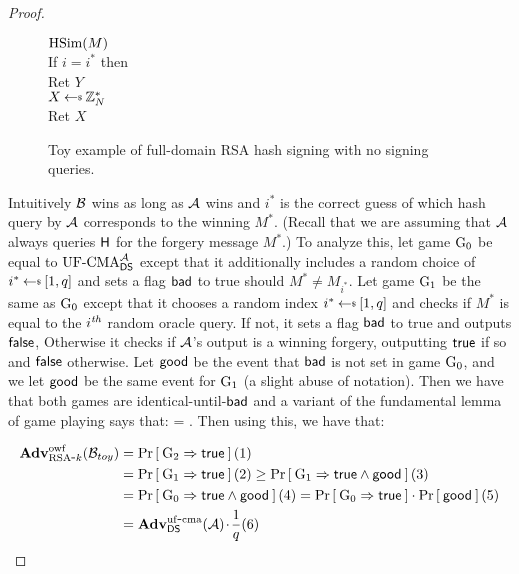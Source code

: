 \begin{proof}
\begin{figure}
{\underline{$\textnormal{HSim}(M)$}\\
If $i = i^*$ then\\
\myInd Ret $Y$\\
$X \getsr \Z_N^*$\\
Ret $X$
}
  \caption{Toy example of full-domain RSA hash signing with no signing queries.}
\label{fig:fulldomaintoy}
\end{figure}


Intuitively ${\mathcal B}$ wins as long as ${\mathcal A}$ wins and $i^*$ is the correct guess
of which hash query by ${\mathcal A}$ corresponds to the winning $M^*$. (Recall that we
are assuming that ${\mathcal A}$ always queries $\mathsf{H}$ for the forgery message
$M^*$.) To analyze this, let game ${{\textnormal G}}_0$ be equal to $\textnormal{UF-CMA}_{{\mathsf{DS}}}^{\mathcal A}$ except
that it additionally includes a random choice of $i^* \getsr [1,q]$ and sets a
flag $\mathsf{bad}$ to true should $M^* \ne M_{i^*}$. Let
game ${{\textnormal G}}_1$ be the same as ${{\textnormal G}}_0$ except that  it chooses a random index $i^*
\getsr [1,q]$ and checks if $M^*$ is equal to the $i^{\textit{th}}$ random oracle
query. If not, it sets a flag $\mathsf{bad}$ to true and outputs $\mathsf{false}$, 
Otherwise it checks if ${\mathcal A}$'s output is a winning forgery, outputting
$\mathsf{true}$ if so and $\mathsf{false}$ otherwise. Let $\mathsf{good}$ be the event that $\mathsf{bad}$ is
not set in game ${{\textnormal G}}_0$, and we let $\mathsf{good}$ be the same event for ${{\textnormal G}}_1$ (a
slight abuse of notation). Then we have that both games are
identical-until-$\mathsf{bad}$ and a variant of the fundamental lemma of game playing
says that:
\bnm
  \Prob{\G_0 \Rightarrow\true \land\good} = \Prob{\G_1\Rightarrow\true \land
  \good} \;.
\enm
Then using this, we have that:
\iffalse
\begin{align*}
\AdvOWF{\RSAk}{\advB_{toy}} 
  &\ge \Prob{\G_0\Rightarrow\true\land\good} (2)\\
  &= \Prob{\G_1\Rightarrow\true\land\good} (3)\\
  &= \Prob{\G_1\Rightarrow\true}\cdot\Prob{\good} (4)\\
  &= \AdvUFCMA{\DS}{\advA}\cdotsm\frac{1}{q_h} (5)
\end{align*}
\fi

\begin{align*}
\mathbf{Adv}^{\mathrm{owf}}_{{\textnormal{RSA}\mbox{-} k}}({\mathcal B}_{toy}) 
  &= \Pr\left[\: {{\textnormal G}}_2\Rightarrow\mathsf{true} \:\right] (1) \\
  &= \Pr\left[\: {{\textnormal G}}_1\Rightarrow\mathsf{true} \:\right] (2)
  \ge \Pr\left[\: {{\textnormal G}}_1\Rightarrow\mathsf{true}\land\mathsf{good} \:\right] (3)\\
  &= \Pr\left[\: {{\textnormal G}}_0\Rightarrow\mathsf{true}\land\mathsf{good} \:\right] (4)
  = \Pr\left[\: {{\textnormal G}}_0\Rightarrow\mathsf{true} \:\right]\cdot\Pr\left[\: \mathsf{good} \:\right] (5)\\
  &= \mathbf{Adv}^{\mathrm{uf\mbox{-} cma}}_{{\mathsf{DS}}}({\mathcal A}){\hspace{-0.1ex}}{\hspace{-0.1ex}}{\hspace{-0.1ex}}\cdot{\hspace{-0.1ex}}{\hspace{-0.1ex}}{\hspace{-0.1ex}}\frac{1}{q} (6)
\end{align*}



\end{proof}
